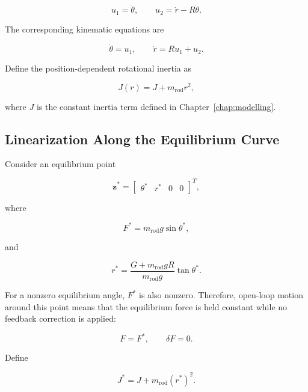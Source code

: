 \begin{equation}
u_1=\dot{\theta},
\qquad
u_2=\dot{r}-R\dot{\theta}.
\end{equation}

The corresponding kinematic equations are

\begin{equation}
\dot{\theta}=u_1,
\qquad
\dot{r}=Ru_1+u_2.
\label{eq:open-loop-kinematics}
\end{equation}

Define the position-dependent rotational inertia as

\begin{equation}
J(r)=J+m_{\mathrm{rod}}r^2,
\end{equation}

where $J$ is the constant inertia term defined in Chapter~\ref{chap:modelling}.

\subsection{Linearization Along the Equilibrium Curve}

Consider an equilibrium point

\begin{equation}
\mathbf{z}^{*}
=
\begin{bmatrix}
\theta^{*} &
r^{*} &
0 &
0
\end{bmatrix}^{T},
\end{equation}

where

\begin{equation}
F^{*}
=
m_{\mathrm{rod}}g\sin\theta^{*},
\end{equation}

and

\begin{equation}
r^{*}
=
\frac{G+m_{\mathrm{rod}}gR}
     {m_{\mathrm{rod}}g}
\tan\theta^{*}.
\end{equation}

For a nonzero equilibrium angle, $F^{*}$ is also nonzero. Therefore, open-loop motion around this point means that the equilibrium force is held constant while no feedback correction is applied:

\begin{equation}
F=F^{*},
\qquad
\delta F=0.
\end{equation}

Define

\begin{equation}
J^{*}
=
J+m_{\mathrm{rod}}(r^{*})^2.
\end{equation}

